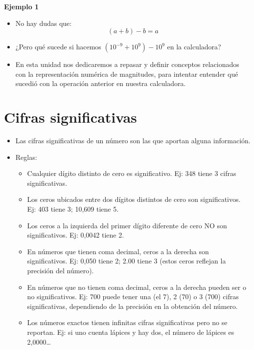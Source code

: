 \documentclass[openany]{book}
\providecommand{\tightlist}{%
  \setlength{\itemsep}{0pt}\setlength{\parskip}{0pt}}
\begin{document}
\textbf{Ejemplo 1}

\begin{itemize}
\item
  No hay dudas que:
  \[ (a + b) - b = a \]
\item
  ¿Pero qué sucede si hacemos \((10^{-9} + 10^9) - 10^9\) en la calculadora?
\item
  En esta unidad nos dedicaremos a repasar y definir conceptos relacionados con la representación numérica de magnitudes, para intentar entender qué sucedió con la operación anterior en nuestra calculadora.
\end{itemize}

\hypertarget{cifras-significativas}{%
\section{Cifras significativas}\label{cifras-significativas}}

\begin{itemize}
\tightlist
\item
  Las cifras significativas de un número son las que aportan alguna información.
\item
  Reglas:

  \begin{itemize}
  \tightlist
  \item
    Cualquier dígito distinto de cero es significativo. Ej: 348 tiene 3 cifras significativas.
  \item
    Los ceros ubicados entre dos dígitos distintos de cero son significativos. Ej: 403 tiene 3; 10,609 tiene 5.
  \item
    Los ceros a la izquierda del primer dígito diferente de cero NO son significativos. Ej: 0,0042 tiene 2.
  \item
    En números que tienen coma decimal, ceros a la derecha son significativos. Ej: 0,050 tiene 2; 2.00 tiene 3 (estos ceros reflejan la precisión del número).
  \item
    En números que no tienen coma decimal, ceros a la derecha pueden ser o no significativos. Ej: 700 puede tener una (el 7), 2 (70) o 3 (700) cifras significativas, dependiendo de la precisión en la obtención del número.
  \item
    Los números exactos tienen infinitas cifras significativas pero no se reportan. Ej: si uno cuenta lápices y hay dos, el número de lápices es 2,0000\ldots{}
  \end{itemize}
\end{itemize}
\end{document}
